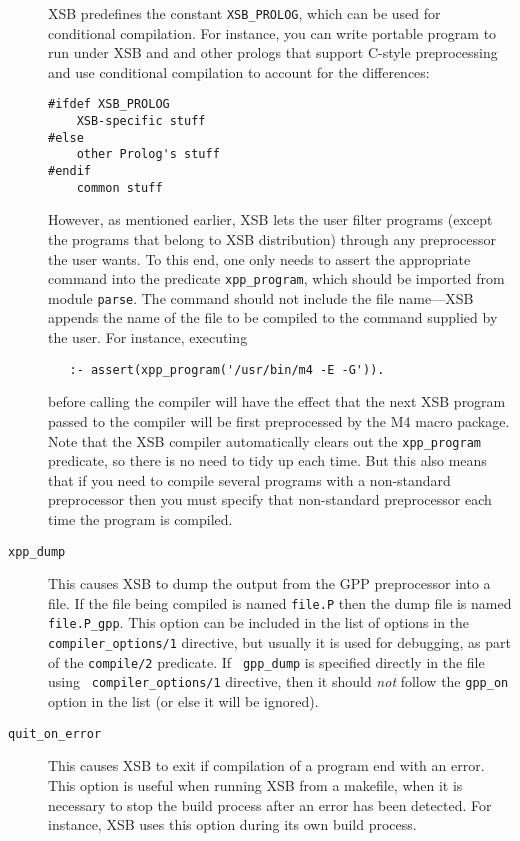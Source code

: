\begin{description}
  XSB predefines the constant {\tt XSB\_PROLOG}, which can be used for
  conditional compilation. For instance, you can write portable program
  to run under XSB and and other prologs that support C-style
  preprocessing and use conditional compilation to account for the
  differences: 
  \begin{samepage}
  \begin{verbatim}
#ifdef XSB_PROLOG
    XSB-specific stuff
#else
    other Prolog's stuff
#endif
    common stuff
  \end{verbatim}
  \end{samepage}

  However, as mentioned earlier, XSB lets the user filter programs (except
  the programs that belong to XSB distribution) through any preprocessor
  the user wants. To this end, one only needs to assert the appropriate
  command into the predicate \verb|xpp_program|, which should be imported
  from module {\tt parse}. The command should not include the file
  name---XSB appends the name of the file to be compiled to the command
  supplied by the user. For instance, executing
  \begin{verbatim}
   :- assert(xpp_program('/usr/bin/m4 -E -G')).
  \end{verbatim}
  before calling the compiler will have the effect that the next XSB
  program passed to the compiler will be first preprocessed by the M4 macro
  package. Note that the XSB compiler automatically clears out the
  {\tt xpp\_program} predicate, so there is no need to tidy up each time.
  But this also means that if you need to compile several programs with a
  non-standard preprocessor then you must specify that non-standard
  preprocessor each time the program is compiled.
  
\item[{\tt xpp\_dump}] 
  This causes XSB to dump the output from the GPP preprocessor into a file.
  If the file being compiled is named {\tt file.P} then the dump file is
  named {\tt file.P\_gpp}. This option can be included in the list of
  options in the {\tt compiler\_options/1} directive, but usually it is
  used for debugging, as part of the {\tt compile/2} predicate. If {\tt
    gpp\_dump} is specified directly in the file using {\tt
    compiler\_options/1} directive, then it should \emph{not} follow the
  {\tt gpp\_on} option in the list (or else it will be ignored).

\item[{\tt quit\_on\_error}] 
  This causes XSB to exit if compilation of a program end with an error.
  This option is useful when running XSB from a makefile, when it is
  necessary to stop the build process after an error has been detected. For
  instance, XSB uses this option during its own build process.



\end{description}
